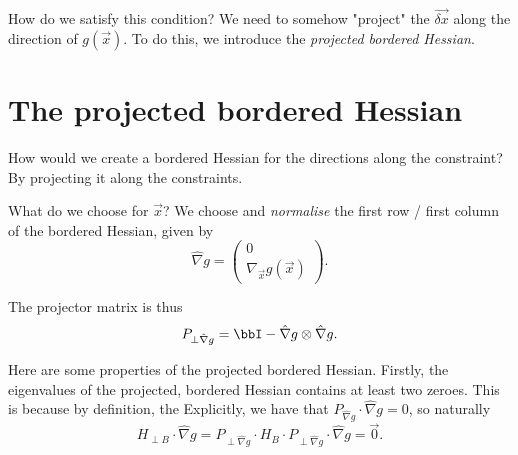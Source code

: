 \documentclass[a4paper, 12pt,oneside,openany]{book}
\begin{document}
How do we satisfy this condition? We need to somehow "project" the $\vec{\delta x}$ along the direction of $g(\vec{x})$. To do this, we introduce the \emph{projected bordered Hessian}. 

\section{The projected bordered Hessian}

How would we create a bordered Hessian for the directions along the constraint? By projecting it along the constraints.



What do we choose for $\vec{x}$? We choose and \emph{normalise} the first row / first column of the bordered Hessian, given by $$\hat{\nabla} g = \begin{pmatrix} 0 \\ \nabla_{\vec{x}} g(\vec{x}) \end{pmatrix}.$$

The projector matrix is thus $$P_{\perp \hat{\nabla} g} = \bbI - \hat{\nabla} g \otimes \hat{\nabla} g.$$


Here are some properties of the projected bordered Hessian. Firstly, the eigenvalues of the projected, bordered Hessian contains at least two zeroes. This is because by definition, the  Explicitly, we have that $P_{\hat{\nabla} g} \cdot \hat{\nabla} g =0$, so naturally $$H_{\perp B} \cdot \hat{\nabla} g  = P_{\perp \hat{\nabla} g} \cdot H_B \cdot P_{\perp \hat{\nabla} g} \cdot \hat{\nabla} g = \vec{0}.$$
\end{document}
